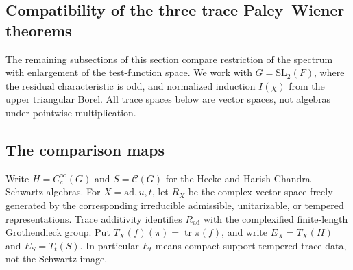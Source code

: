 \subsection{Compatibility of the three trace Paley--Wiener theorems}\label{sec:pwcomparison}
The remaining subsections of this section compare restriction of the spectrum with enlargement of the test-function space. We work with $G=\mathrm{SL}_2(F)$, where the residual characteristic is odd, and normalized induction $I(\chi)$ from the upper triangular Borel. All trace spaces below are vector spaces, not algebras under pointwise multiplication.

\subsection{The comparison maps}
Write $H=C_c^\infty(G)$ and $S=\mathcal C(G)$ for the Hecke and Harish-Chandra Schwartz algebras. For $X=\mathrm{ad},u,t$, let $R_X$ be the complex vector space freely generated by the corresponding irreducible admissible, unitarizable, or tempered representations. Trace additivity identifies $R_{\mathrm{ad}}$ with the complexified finite-length Grothendieck group. Put $T_X(f)(\pi)=\operatorname{tr}\pi(f)$, and write $E_X=T_X(H)$ and $E_S=T_t(S)$. In particular $E_t$ means compact-support tempered trace data, not the Schwartz image.

\begin{center}
\end{center}

